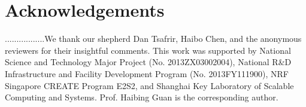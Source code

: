 \section{Acknowledgements}
\label{sec:ack}
.................We thank  our shepherd Dan Tsafrir, Haibo Chen, and the anonymous reviewers for their insightful comments. This work was supported by National Science and Technology Major Project (No. 2013ZX03002004), National R\&D Infrastructure and Facility Development Program (No. 2013FY111900), NRF Singapore CREATE Program E2S2, and Shanghai
Key Laboratory of Scalable Computing and Systems. Prof. Haibing Guan is the corresponding author.
